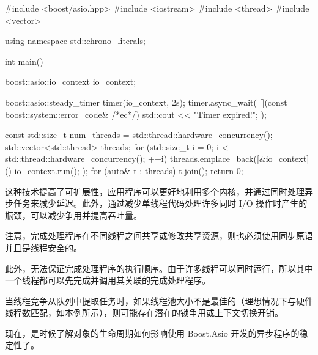 \begin{cpp}
#include <boost/asio.hpp>
#include <iostream>
#include <thread>
#include <vector>

using namespace std::chrono_literals;

int main() {
    boost::asio::io_context io_context;

    boost::asio::steady_timer timer(io_context, 2s);
    timer.async_wait(
    [](const boost::system::error_code& /*ec*/) {
        std::cout << "Timer expired!\n";
    });

    const std::size_t num_threads =
                std::thread::hardware_concurrency();
    std::vector<std::thread> threads;
    for (std::size_t i = 0;
        i < std::thread::hardware_concurrency(); ++i) {
            threads.emplace_back([&io_context]() {
                io_context.run();
            });
    }
    for (auto& t : threads) {
        t.join();
    }
    return 0;
}
\end{cpp}

这种技术提高了可扩展性，应用程序可以更好地利用多个内核，并通过同时处理异步任务来减少延迟。此外，通过减少单线程代码处理许多同时 I/O 操作时产生的瓶颈，可以减少争用并提高吞吐量。

注意，完成处理程序在不同线程之间共享或修改共享资源，则也必须使用同步原语并且是线程安全的。

此外，无法保证完成处理程序的执行顺序。由于许多线程可以同时运行，所以其中一个线程都可以先完成并调用其关联的完成处理程序。

当线程竞争从队列中提取任务时，如果线程池大小不是最佳的（理想情况下与硬件线程数匹配，如本例所示），则可能存在潜在的锁争用或上下文切换开销。

现在，是时候了解对象的生命周期如何影响使用 Boost.Asio 开发的异步程序的稳定性了。






























